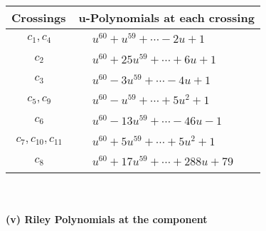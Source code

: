 \documentclass[1p]{elsarticle_modified}
\theoremstyle{definition}
\begin{document}
\begin{tabular}{m{50pt}|m{274pt}}
Crossings & \hspace{64pt}u-Polynomials at each crossing \\
\hline $$\begin{aligned}c_{1},c_{4}\end{aligned}$$&$\begin{aligned}
&u^{60}+u^{59}+\cdots-2 u+1
\end{aligned}$\\
\hline $$\begin{aligned}c_{2}\end{aligned}$$&$\begin{aligned}
&u^{60}+25 u^{59}+\cdots+6 u+1
\end{aligned}$\\
\hline $$\begin{aligned}c_{3}\end{aligned}$$&$\begin{aligned}
&u^{60}-3 u^{59}+\cdots-4 u+1
\end{aligned}$\\
\hline $$\begin{aligned}c_{5},c_{9}\end{aligned}$$&$\begin{aligned}
&u^{60}- u^{59}+\cdots+5 u^2+1
\end{aligned}$\\
\hline $$\begin{aligned}c_{6}\end{aligned}$$&$\begin{aligned}
&u^{60}-13 u^{59}+\cdots-46 u-1
\end{aligned}$\\
\hline $$\begin{aligned}c_{7},c_{10},c_{11}\end{aligned}$$&$\begin{aligned}
&u^{60}+5 u^{59}+\cdots+5 u^2+1
\end{aligned}$\\
\hline $$\begin{aligned}c_{8}\end{aligned}$$&$\begin{aligned}
&u^{60}+17 u^{59}+\cdots+288 u+79
\end{aligned}$\\
\hline
\end{tabular}\\~\\
\newpage\renewcommand{\arraystretch}{1}
\flushleft \textbf{(v) Riley Polynomials at the component}\newline \\
\end{document}
